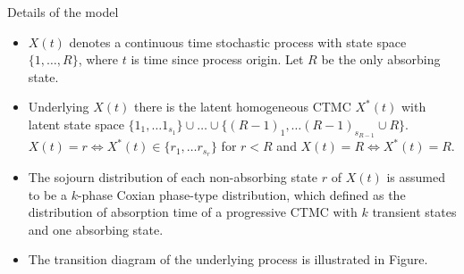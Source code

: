 \documentclass{beamer}
\begin{document}
\begin{frame}{Details of the model}
\begin{itemize}
\item $X(t)$ denotes a continuous time stochastic process with state space $\{1,\ldots, R\}$, where $t$ is time since process origin. Let $R$ be the only absorbing state. 
\item Underlying $X(t)$ there is the latent homogeneous CTMC $X^*(t)$ with latent state space $\{1_1,\ldots1_{s_1}\}\cup \ldots \cup \{(R-1)_1,\ldots (R-1)_{s_{R-1}} \cup R\} $. $X(t)=r \Leftrightarrow X^*(t) \in \{r_1,\ldots r_{s_r}\}$ for $r<R$ and $X(t)=R \Leftrightarrow X^*(t) =R$. 
\item The sojourn distribution of each non-absorbing state $r$ of $X(t)$ is assumed to be a $k$-phase Coxian phase-type distribution, which defined as the distribution of absorption time of a progressive CTMC with $k$ transient states and one absorbing state. 
\item The transition diagram of the underlying process is illustrated in Figure.

\end{itemize}
\end{frame}
\end{document}
